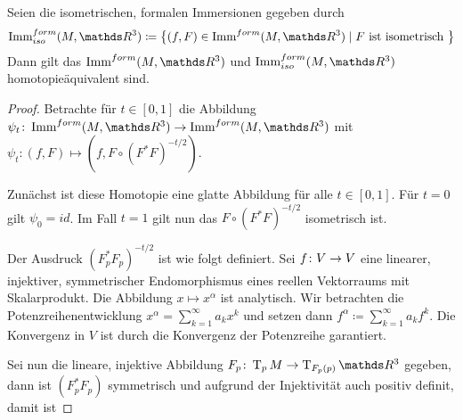 \begin{Satz}
  Seien die isometrischen, formalen Immersionen gegeben durch
  \begin{gather*}
    \Immfi{M}{\R^3} \coloneqq \set{(f,F) \in \Immf{M}{\R^3}}{F \text{
        ist isometrisch }}
  \end{gather*}
  Dann gilt das $\Immf{M}{\R^3}$ und $\Immfi{M}{\R^3}$
  homotopieäquivalent sind.
	\begin{proof}
          Betrachte für $t \in [0,1]$ die Abbildung
          $\abb{\psi_t}{\Immf{M}{\R^3}}{\Immf{M}{\R^3}}$ mit
          $\psi_t : (f,F) \mapsto (f,F \circ
          (F^{\ast}F)^{-t/2})$.
		
          Zunächst ist diese Homotopie eine glatte Abbildung für alle
          $ t \in [0,1] $. Für $ t=0 $ gilt $ \psi_0 = id $. Im Fall
          $ t=1 $ gilt nun das $ F \circ (F^{\ast}F)^{-t/2} $
          isometrisch ist.
		
          Der Ausdruck $ (F_p^\ast F_p)^{-t/2} $ ist wie folgt
          definiert. Sei $ f \colon V \rightarrow V $ eine linearer, injektiver,
          symmetrischer Endomorphismus eines reellen Vektorraums mit
          Skalarprodukt. Die Abbildung $ x\mapsto x^\alpha $ ist analytisch.
          Wir betrachten die Potenzreihenentwicklung $ x^\alpha = \sum_{k=1}^{\infty} a_k x^k $ und setzen dann $ f^\alpha \coloneqq \sum_{k=1}^{\infty} a_k f^k $. Die Konvergenz in $ V $ ist durch
          die Konvergenz der Potenzreihe garantiert.
		
          Sei nun die lineare, injektive Abbildung
          $ \abb{F_p}{\tang{p}{M}}{\tang{F_p(p)}{\R^3}} $ gegeben,
          dann ist $ (F_p^\ast F_p) $ symmetrisch und aufgrund der
          Injektivität auch positiv definit, damit ist
		

\end{proof}
\end{Satz}
